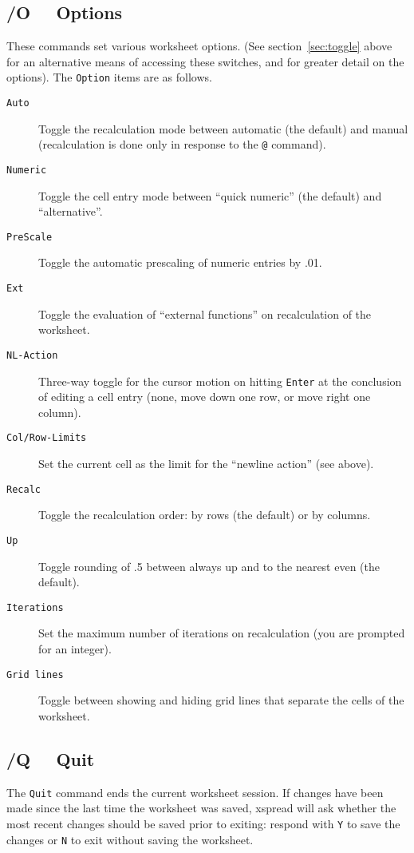 \documentclass[titlepage]{article}
\newcommand{\titem}[1]{\item[{\tt #1}]}
\begin{document}
\subsection[Setting Program Options]{/O \ \ Options}
\label{menuoptions}

These commands set various worksheet options.  (See
section~\ref{sec:toggle} above for an alternative means of accessing
these switches, and for greater detail on the options).  The
\texttt{Option} items are as follows.

\begin{description}

  \titem{Auto} Toggle the recalculation mode between automatic (the
  default) and manual (recalculation is done only in response to the
  \texttt{@} command).  
  
  \titem{Numeric} Toggle the cell entry mode between ``quick numeric''
  (the default) and ``alternative''.
  
  \titem{PreScale} Toggle the automatic prescaling of numeric entries
  by .01.
  
  \titem{Ext} Toggle the evaluation of ``external functions'' on
  recalculation of the worksheet.
  
  \titem{NL-Action} Three-way toggle for the cursor motion on hitting
  \texttt{Enter} at the conclusion of editing a cell entry (none, move
  down one row, or move right one column).
    
  \titem{Col/Row-Limits} Set the current cell as the limit for the
  ``newline action'' (see above).  
  
  \titem{Recalc} Toggle the recalculation order: by rows (the default)
  or by columns.

  \titem{Up} Toggle rounding of .5 between always up and to the nearest
  even (the default).  

  \titem{Iterations} Set the maximum number of
  iterations on recalculation (you are prompted for an integer).

  \titem{Grid lines} Toggle between showing and hiding grid lines that
   separate the cells of the worksheet.

\end{description}

\subsection[Quitting the Program]{/Q \ \       Quit}

The \texttt{Quit} command ends the current worksheet session.  If
changes have been made since the last time the worksheet was saved,
\textsf{xspread} will ask whether the most recent changes
should be saved prior to exiting: respond with \texttt{Y} to save the
changes or \texttt{N} to exit without saving the worksheet.
\end{document}
